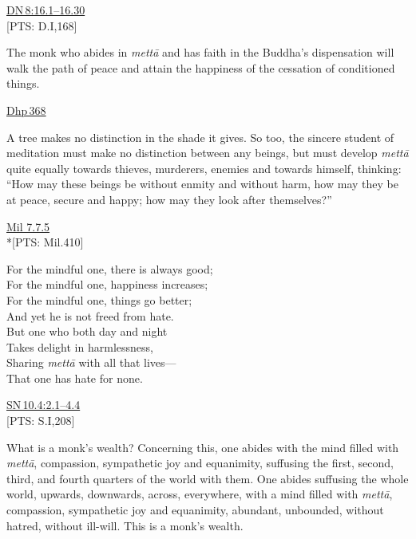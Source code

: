 \documentclass[10pt, openright]{book}
\begin{document}
\begin{flushright}
\href{https://suttacentral.net/dn8/en/sujato\#16.1}{DN 8:16.1–16.30}\\

[PTS: D.I,168]


\end{flushright}
The monk who abides in \textit{mettā} and has faith in the Buddha’s dispensation will walk the path of peace and attain the happiness of the cessation of conditioned things.


\begin{flushright}
\href{https://suttacentral.net/dhp368/en/sujato}{Dhp 368}


\end{flushright}
A tree makes no distinction in the shade it gives. So too, the sincere student of meditation must make no distinction between any beings, but must develop \textit{mettā} quite equally towards thieves, murderers, enemies and towards himself, thinking: “How may these beings be without enmity and without harm, how may they be at peace, secure and happy; how may they look after themselves?”


\begin{flushright}
\href{https://suttacentral.net/mil7.7.5/en/tw_rhysdavids?reference=main/pts#pts-vp-pli410}{Mil 7.7.5}\\

*[PTS: Mil.410]


\end{flushright}


\begin{itemize}


For the mindful one, there is always good; \\ 
For the mindful one, happiness increases; \\ 
For the mindful one, things go better; \\ 
And yet he is not freed from hate. \\ 
But one who both day and night \\ 
Takes delight in harmlessness, \\ 
Sharing \textit{mettā} with all that lives— \\ 
That one has hate for none.


\end{itemize}
\begin{flushright}
\href{https://suttacentral.net/sn10.4/en/sujato\#2.1}{SN 10.4:2.1–4.4}\\

[PTS: S.I,208]


\end{flushright}
What is a monk’s wealth? Concerning this, one abides with the mind filled with \textit{mettā}, compassion, sympathetic joy and equanimity, suffusing the first, second, third, and fourth quarters of the world with them. One abides suffusing the whole world, upwards, downwards, across, everywhere, with a mind filled with \textit{mettā}, compassion, sympathetic joy and equanimity, abundant, unbounded, without hatred, without ill-will. This is a monk’s wealth.
\end{document}
